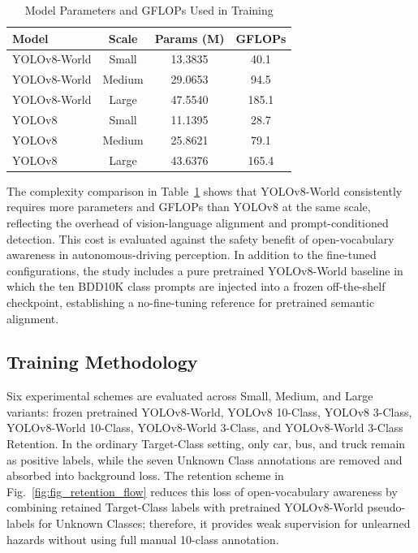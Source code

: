 \documentclass[conference]{IEEEtran}
\begin{document}
\begin{table}[htbp]
\caption{Model Parameters and GFLOPs Used in Training}
\begin{center}
\begin{tabular}{|l|c|c|c|}
\hline
\textbf{Model} & \textbf{Scale} & \textbf{Params (M)} & \textbf{GFLOPs} \\
\hline
YOLOv8-World & Small & 13.3835 & 40.1 \\
YOLOv8-World & Medium & 29.0653 & 94.5 \\
YOLOv8-World & Large & 47.5540 & 185.1 \\
\hline
YOLOv8 & Small & 11.1395 & 28.7 \\
YOLOv8 & Medium & 25.8621 & 79.1 \\
YOLOv8 & Large & 43.6376 & 165.4 \\
\hline
\end{tabular}
\label{tab:model_complexity_runner_logs}
\end{center}
\end{table}




The complexity comparison in Table~\ref{tab:model_complexity_runner_logs} shows that YOLOv8-World consistently requires more parameters and GFLOPs than YOLOv8 at the same scale, reflecting the overhead of vision-language alignment and prompt-conditioned detection. This cost is evaluated against the safety benefit of open-vocabulary awareness in autonomous-driving perception. In addition to the fine-tuned configurations, the study includes a pure pretrained YOLOv8-World baseline in which the ten BDD10K class prompts are injected into a frozen off-the-shelf checkpoint, establishing a no-fine-tuning reference for pretrained semantic alignment.


\subsection{Training Methodology}
Six experimental schemes are evaluated across Small, Medium, and Large variants: frozen pretrained YOLOv8-World, YOLOv8 10-Class, YOLOv8 3-Class, YOLOv8-World 10-Class, YOLOv8-World 3-Class, and YOLOv8-World 3-Class Retention. In the ordinary Target-Class setting, only car, bus, and truck remain as positive labels, while the seven Unknown Class annotations are removed and absorbed into background loss. The retention scheme in Fig.~\ref{fig:fig_retention_flow} reduces this loss of open-vocabulary awareness by combining retained Target-Class labels with pretrained YOLOv8-World pseudo-labels for Unknown Classes; therefore, it provides weak supervision for unlearned hazards without using full manual 10-class annotation.
\end{document}
